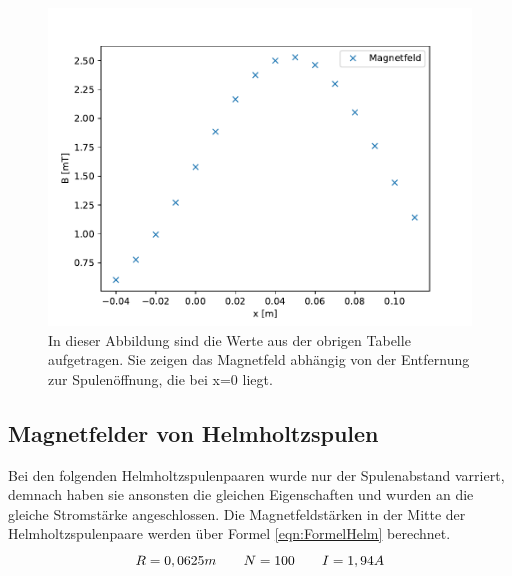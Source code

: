 \documentclass[titlepage = firstcover]{scrartcl}
\begin{document}
                \begin{figure}[h]
                    \centering
                    \includegraphics{Spulekurz.pdf}
                    \caption{In dieser Abbildung sind die Werte aus der obrigen Tabelle aufgetragen. Sie zeigen das Magnetfeld abhängig von der Entfernung zur Spulenöffnung, die bei x=0 liegt.}
                    \label{fig:Spulekurz}
    
                \end{figure}
    
                \FloatBarrier
                \newpage
    
    
        \subsection{Magnetfelder von Helmholtzspulen}
                Bei den folgenden Helmholtzspulenpaaren wurde nur der Spulenabstand varriert, demnach haben sie ansonsten die gleichen Eigenschaften und wurden an
                die gleiche Stromstärke angeschlossen. Die Magnetfeldstärken in der Mitte der Helmholtzspulenpaare werden über Formel \ref{eqn:FormelHelm} 
                berechnet.
                \begin{equation*}
                    R = 0,0625m \qquad N = 100 \qquad I = 1,94A \\
                \end{equation*}
\end{document}
